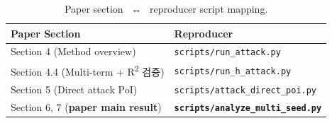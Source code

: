\documentclass[11pt]{article}
\theoremstyle{plain}
\theoremstyle{definition}
\theoremstyle{remark}
\begin{document}
\begin{table}[h!]
\centering
\caption{Paper section \ ↔ \ reproducer script mapping.}
\label{tab:repro}
\small
\begin{tabular}{ll}
\toprule
Paper Section & Reproducer \\
\midrule
Section 4 (Method overview) & \texttt{scripts/run\_attack.py} \\
Section 4.4 (Multi-term + R\textsuperscript{2} 검증) & \texttt{scripts/run\_h\_attack.py} \\
Section 5 (Direct attack PoI) & \texttt{scripts/attack\_direct\_poi.py} \\
Section 6, 7 (\textbf{paper main result}) & \textbf{\texttt{scripts/analyze\_multi\_seed.py}} \\
\bottomrule
\end{tabular}
\end{table}
\end{document}
